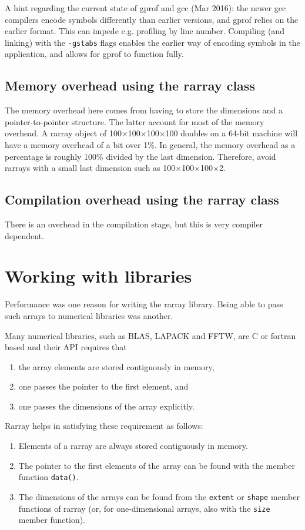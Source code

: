 \documentclass[11pt,twoside]{article}
\begin{document}
A hint regarding the current state of gprof and gcc (Mar 2016):  the
newer gcc compilers encode symbols
differently than earlier versions, and gprof relies on the earlier
format. This can impede e.g. profiling by line number. Compiling (and
linking) with the \texttt{-gstabs} flags enables the earlier way of encoding
symbols in  the application, and allows for gprof to function fully.

\subsection{Memory overhead using the rarray class}

The memory overhead here comes from having to store the dimensions and a pointer-to-pointer structure.  The latter account for most of the memory overhead.   A rarray object of 100$\times$100$\times$100$\times$100  doubles on a 64-bit machine will have a memory overhead of a bit over 1\%. In general, the memory overhead as a percentage is roughly 100\% divided by the last dimension. Therefore, avoid rarrays with a small last dimension such as 100$\times$100$\times$100$\times$2.

\subsection{Compilation overhead using the rarray class}

There is an overhead in the compilation stage, but this is very compiler dependent.

\section{Working with libraries}
\label{libraries}

Performance was one reason for writing the rarray library.  Being able
to pass such arrays to numerical libraries was another.

Many numerical libraries, such as BLAS, LAPACK and FFTW, are C or
fortran based and their API requires that
\begin{enumerate}
\item the array elements are stored contiguously in memory,
\item one passes the pointer to the first element, and
\item one passes the dimensions of the array explicitly.
\end{enumerate}
Rarray helps in satisfying these requirement as follows:
\begin{enumerate}
\item Elements of a rarray are always stored contiguously in memory.
\item The pointer to the first elements of the array can be found with
  the member function \texttt{data()}.
\item The dimensions of the arrays can be found from
    the \texttt{extent} or \texttt{shape} member functions of rarray (or, for
    one-dimensional arrays, also with the \texttt{size} member function).
\end{enumerate}
\end{document}
